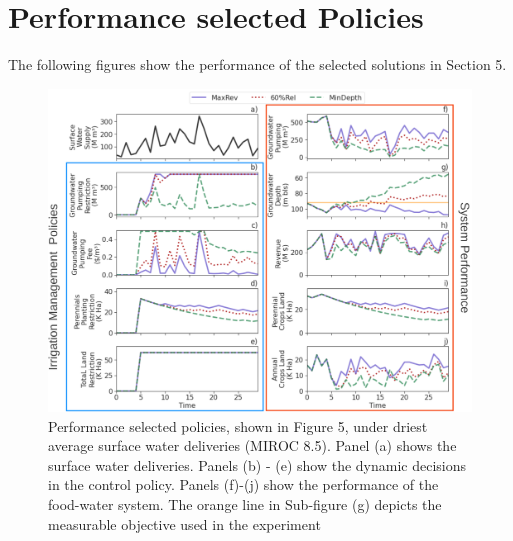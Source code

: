 \documentclass[11pt,a4paper]{article}
\begin{document}
\section{Performance selected Policies}

The following figures show the performance of the selected solutions in Section 5.

\begin{figure}[H]
    \centering
    \includegraphics[width=1\textwidth]{./figs/selected_dry_performance.png}
    \caption{Performance selected policies, shown in Figure 5, under driest average surface water deliveries (MIROC 8.5). Panel (a) shows the surface water deliveries. Panels (b) - (e) show the dynamic decisions in the control policy. Panels (f)-(j) show the performance of the food-water system. The orange line in Sub-figure (g) depicts the measurable objective used in the experiment}
    \label{fig:m1esh1}
\end{figure}
\end{document}
